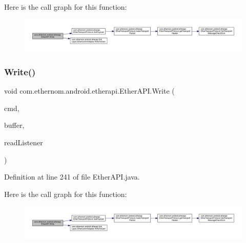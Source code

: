 Here is the call graph for this function\+:\nopagebreak
\begin{figure}[H]
\begin{center}
\leavevmode
\includegraphics[width=350pt]{classcom_1_1ethernom_1_1android_1_1etherapi_1_1_ether_a_p_i_a404cbb6c5364773e3c97e86192e1762d_cgraph}
\end{center}
\end{figure}
\mbox{\label{classcom_1_1ethernom_1_1android_1_1etherapi_1_1_ether_a_p_i_abe97e3ee72cd97fb6c210a907e1bfcaa}} 
\subsubsection{\texorpdfstring{Write()}{Write()}\hspace{0.1cm}{\footnotesize\ttfamily [4/6]}}
{\footnotesize\ttfamily void com.\+ethernom.\+android.\+etherapi.\+Ether\+A\+P\+I.\+Write (\begin{DoxyParamCaption}\item[{byte}]{cmd,  }\item[{String \mbox{[}$\,$\mbox{]}}]{buffer,  }\item[{final \mbox{\hyperlink{interfacecom_1_1ethernom_1_1android_1_1etherapi_1_1_read_listener}{Read\+Listener}}}]{read\+Listener }\end{DoxyParamCaption})}



Definition at line 241 of file Ether\+A\+P\+I.\+java.

Here is the call graph for this function\+:\nopagebreak
\begin{figure}[H]
\begin{center}
\leavevmode
\includegraphics[width=350pt]{classcom_1_1ethernom_1_1android_1_1etherapi_1_1_ether_a_p_i_abe97e3ee72cd97fb6c210a907e1bfcaa_cgraph}
\end{center}
\end{figure}
\mbox{\label{classcom_1_1ethernom_1_1android_1_1etherapi_1_1_ether_a_p_i_a397b87cd1ab2b0d151289e39b8b2f16c}} 
